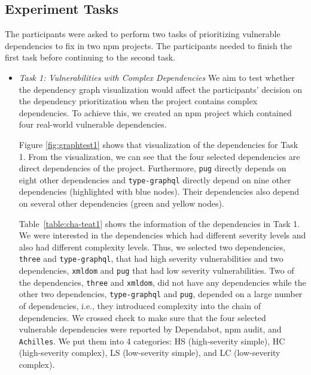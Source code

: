 \documentclass[conference]{IEEEtran}
\begin{document}
	

	
	\subsection{Experiment Tasks} 
	The participants were asked to perform two tasks of prioritizing vulnerable dependencies to fix in two npm projects. The participants needed to finish the first task before continuing to the second task. 
	\begin{itemize}
	    \item \textit{Task 1: Vulnerabilities with Complex Dependencies} We aim to test whether the dependency graph visualization would affect the participants’ decision on the dependency prioritization when the project contains complex dependencies. To achieve this, we created an npm project which contained four real-world vulnerable dependencies. 
	    
	     Figure \ref{fig:graphtest1} shows that visualization of the dependencies for Task 1.  From the visualization, we can see that the four selected dependencies are direct dependencies of the project. Furthermore, \texttt{pug} directly depends on eight other dependencies  and \texttt{type-graphql} directly depend on nine other dependencies (highlighted with blue nodes). Their dependencies also depend on several other dependencies (green and yellow nodes).
	
		Table~\ref{table:cha-teat1} shows the information of the dependencies in Task 1. 
	    We were interested in the dependencies which had different severity levels and also had different complexity levels. Thus, we selected two dependencies, \texttt{three} and \texttt{type-graphql}, that had high severity vulnerabilities and two dependencies, \texttt{xmldom} and \texttt{pug} that had low severity vulnerabilities. Two of the dependencies, \texttt{three} and \texttt{xmldom}, did not have any dependencies while the other two dependencies, \texttt{type-graphql} and \texttt{pug}, depended on a large number of dependencies, i.e., they introduced complexity into the chain of dependencies. 
	    We crossed check to make sure that the four selected vulnerable dependencies were reported by Dependabot, npm audit, and \texttt{Achilles}. We put them into 4 categories: HS (high-severity simple), HC (high-severity complex), LS (low-severity simple), and LC (low-severity complex).
	

\end{itemize}
\end{document}
